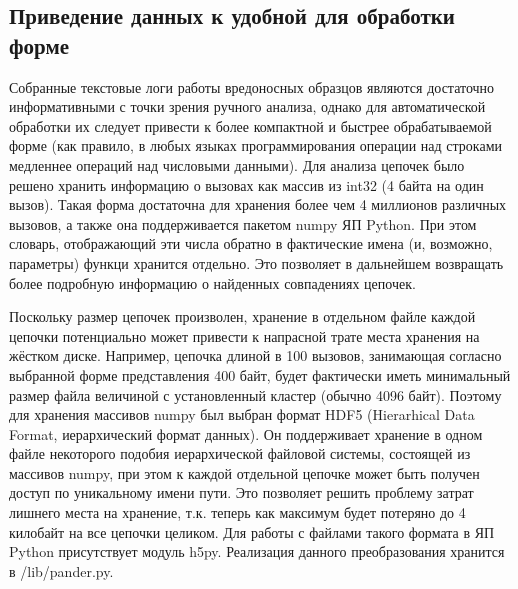 \subsection {Приведение данных к удобной для обработки форме}
Собранные текстовые логи работы вредоносных образцов являются достаточно информативными с точки зрения ручного анализа, однако для автоматической обработки их следует привести к более компактной и быстрее обрабатываемой форме (как правило, в любых языках программирования операции над строками медленнее операций над числовыми данными). Для анализа цепочек было решено хранить информацию о вызовах как массив из int32 (4 байта на один вызов). Такая форма достаточна для хранения более чем 4 миллионов различных вызовов, а также она поддерживается пакетом numpy ЯП Python. При этом словарь, отображающий эти числа обратно в фактические имена (и, возможно, параметры) функци хранится отдельно. Это позволяет в дальнейшем возвращать более подробную информацию о найденных совпадениях цепочек.

Поскольку размер цепочек произволен, хранение в отдельном файле каждой цепочки потенциально может привести к напрасной трате места хранения на жёстком диске. Например, цепочка длиной в 100 вызовов, занимающая согласно выбранной форме представления 400 байт, будет фактически иметь минимальный размер файла величиной с установленный кластер (обычно 4096 байт). Поэтому для хранения массивов numpy был выбран формат HDF5 (Hierarhical Data Format, иерархический формат данных). Он поддерживает хранение в одном файле некоторого подобия иерархической файловой системы, состоящей из массивов numpy, при этом к каждой отдельной цепочке может быть получен доступ по уникальному имени пути. Это позволяет решить проблему затрат лишнего места на хранение, т.к. теперь как максимум будет потеряно до 4  килобайт на все цепочки целиком. Для работы с файлами такого формата в ЯП Python присутствует модуль h5py.
 Реализация данного преобразования хранится в /lib/pander.py.
